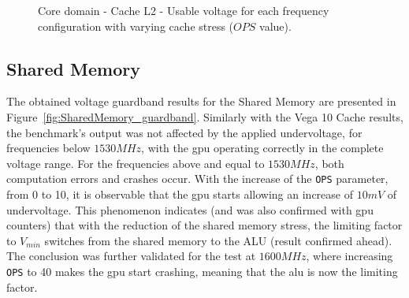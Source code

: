 \begin{figure}[!htb]
    \centering
    \begin{subfigmatrix}{2}
      \label{fig:CacheL2_guardband}
    \end{subfigmatrix}
    \caption{Core domain - Cache L2 - Usable voltage for each frequency configuration with varying cache stress ($OPS$ value).}
\end{figure}


\subsection{Shared Memory}

\label{sec:cache_guardband}

The obtained voltage guardband results for the Shared Memory are presented in Figure~\ref{fig:SharedMemory_guardband}. Similarly with the Vega 10 Cache results, the benchmark's output was not affected by the applied undervoltage, for frequencies below $1530MHz$, with the \acrshort{gpu} operating correctly in the complete voltage range. For the frequencies above and equal to $1530MHz$, both computation errors and crashes occur. With the increase of the \texttt{OPS} parameter, from 0 to 10, it is observable that the \acrshort{gpu} starts allowing an increase of $10mV$ of undervoltage. This phenomenon indicates (and was also confirmed with \acrshort{gpu} counters) that with the reduction of the shared memory stress, the limiting factor to $V_{min}$ switches from the shared memory to the ALU (result confirmed ahead). The conclusion was further validated for the test at $1600MHz$, where increasing  \texttt{OPS} to 40 makes the \acrshort{gpu} start  crashing, meaning that the \acrshort{alu} is now the limiting factor.

